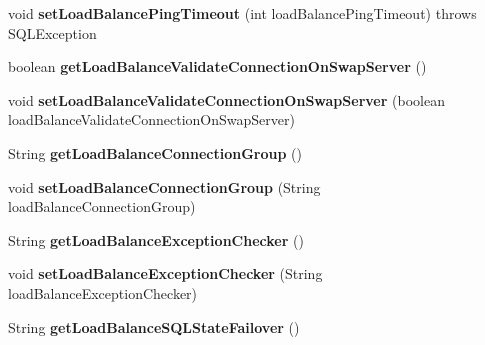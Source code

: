 \begin{DoxyCompactItemize}
void {\bfseries set\+Load\+Balance\+Ping\+Timeout} (int load\+Balance\+Ping\+Timeout)  throws S\+Q\+L\+Exception
\item 
\mbox{\label{interfacecom_1_1mysql_1_1jdbc_1_1_connection_properties_ae4ea38ad692c6532e137251d60f704a3}} 
boolean {\bfseries get\+Load\+Balance\+Validate\+Connection\+On\+Swap\+Server} ()
\item 
\mbox{\label{interfacecom_1_1mysql_1_1jdbc_1_1_connection_properties_abdf29268a07acf0cc1c090daa9d944be}} 
void {\bfseries set\+Load\+Balance\+Validate\+Connection\+On\+Swap\+Server} (boolean load\+Balance\+Validate\+Connection\+On\+Swap\+Server)
\item 
\mbox{\label{interfacecom_1_1mysql_1_1jdbc_1_1_connection_properties_add2b35de1e0b363d05045218e4f2a910}} 
String {\bfseries get\+Load\+Balance\+Connection\+Group} ()
\item 
\mbox{\label{interfacecom_1_1mysql_1_1jdbc_1_1_connection_properties_ac4e20847eb5bcd77675fe1bcda9ff332}} 
void {\bfseries set\+Load\+Balance\+Connection\+Group} (String load\+Balance\+Connection\+Group)
\item 
\mbox{\label{interfacecom_1_1mysql_1_1jdbc_1_1_connection_properties_a93e8bac5becf90731cda38e48def3603}} 
String {\bfseries get\+Load\+Balance\+Exception\+Checker} ()
\item 
\mbox{\label{interfacecom_1_1mysql_1_1jdbc_1_1_connection_properties_a6e0245461b9d355d8438668cfd4f0e79}} 
void {\bfseries set\+Load\+Balance\+Exception\+Checker} (String load\+Balance\+Exception\+Checker)
\item 
\mbox{\label{interfacecom_1_1mysql_1_1jdbc_1_1_connection_properties_a5948f13688e552b08b88875979591ba4}} 
String {\bfseries get\+Load\+Balance\+S\+Q\+L\+State\+Failover} ()
\item 
\mbox{\label{interfacecom_1_1mysql_1_1jdbc_1_1_connection_properties_a413c3e06da932e1b2a5098c8717f03f6}} 

\end{DoxyCompactItemize}
